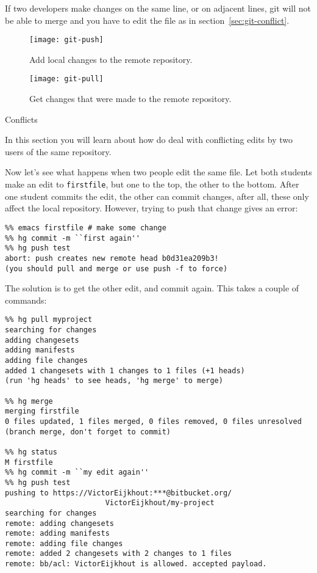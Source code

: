 If two developers make changes on the same line, or on adjacent lines,
git will not be able to merge
and you have to edit the file as in section~\ref{sec:git-conflict}.

\begin{figure}[ht]
  \texttt{[image: git-push]}
  \caption{Add local changes to the remote repository.}
  \label{fig:git-push}
\end{figure}

\begin{figure}[ht]
  \texttt{[image: git-pull]}
  \caption{Get changes that were made to the remote repository.}
  \label{fig:git-pull}
\end{figure}

 {Conflicts}

\begin{purpose}
  In this section you will learn about how do deal with conflicting
  edits by two users of the same repository.
\end{purpose}

Now let's see what happens when two people edit the same file.
Let both students make an edit to \verb+firstfile+, but one to the
top, the other to the bottom. After one student commits the edit, the
other can commit changes, after all, these only affect the local repository.
However, trying to push that change gives an error:
\begin{verbatim}
%% emacs firstfile # make some change
%% hg commit -m ``first again''
%% hg push test
abort: push creates new remote head b0d31ea209b3!
(you should pull and merge or use push -f to force)
\end{verbatim}
The solution is to get the other edit, and commit again. This takes a 
couple of commands:
{\small
\begin{verbatim}
%% hg pull myproject
searching for changes
adding changesets
adding manifests
adding file changes
added 1 changesets with 1 changes to 1 files (+1 heads)
(run 'hg heads' to see heads, 'hg merge' to merge)

%% hg merge
merging firstfile
0 files updated, 1 files merged, 0 files removed, 0 files unresolved
(branch merge, don't forget to commit)

%% hg status
M firstfile
%% hg commit -m ``my edit again''
%% hg push test
pushing to https://VictorEijkhout:***@bitbucket.org/
                       VictorEijkhout/my-project
searching for changes
remote: adding changesets
remote: adding manifests
remote: adding file changes
remote: added 2 changesets with 2 changes to 1 files
remote: bb/acl: VictorEijkhout is allowed. accepted payload.
\end{verbatim}
}

